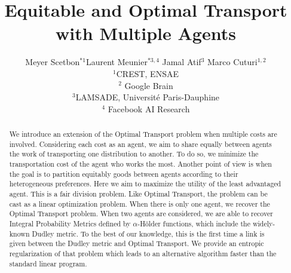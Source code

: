 \documentclass{article}
\title{Equitable and Optimal Transport with Multiple Agents}
\author{
	Meyer Scetbon$^{*1}$\qquad Laurent Meunier$^{*3,4}$ \qquad Jamal Atif$^{3}$ \qquad
	Marco Cuturi$^{1,2}$\\$^{1}$CREST, ENSAE\\
	$^{2}$ Google Brain\\
	$^{3}$LAMSADE, Université Paris-Dauphine\\
	$^{4}$ Facebook AI Research
	}
\date{}
\begin{document}
\maketitle


\begin{abstract}
We introduce an extension of the Optimal Transport problem when multiple costs are involved. Considering each cost as an agent, we aim to share equally between agents the work of transporting one distribution to another. To do so, we minimize the transportation cost of the agent who works the most. Another point of view is when the goal is to partition equitably goods between agents according to their heterogeneous preferences. Here we aim to maximize the utility of the least advantaged agent. This is a fair division problem. Like Optimal Transport, the problem can be cast as a linear optimization problem. When there is only one agent, we recover the Optimal Transport problem. When two agents are considered, we are able to recover Integral Probability Metrics defined by $\alpha$-Hölder functions, which include the widely-known Dudley metric. To the best of our knowledge, this is the first time a link is given between the Dudley metric and Optimal Transport. We provide an entropic regularization of that problem which leads to an alternative algorithm faster than the standard linear program. 
\end{abstract}






%
%

\newpage




\clearpage
\appendix


\end{document}
